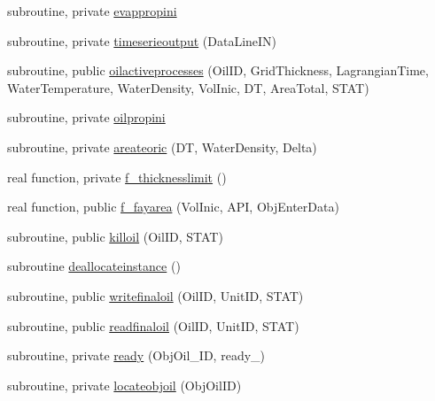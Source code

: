 \begin{DoxyCompactItemize}
\item 
subroutine, private \mbox{\hyperlink{namespacemoduleoil_accb31df9c42356be9b53b31d0d888b3b}{evappropini}}
\item 
subroutine, private \mbox{\hyperlink{namespacemoduleoil_ac0b9f29833f831cd80144ac91359798f}{timeserieoutput}} (Data\+Line\+IN)
\item 
subroutine, public \mbox{\hyperlink{namespacemoduleoil_aa53749d5416d21d1602ffd0208f0f8f2}{oilactiveprocesses}} (Oil\+ID, Grid\+Thickness, Lagrangian\+Time, Water\+Temperature, Water\+Density, Vol\+Inic, DT, Area\+Total, S\+T\+AT)
\item 
subroutine, private \mbox{\hyperlink{namespacemoduleoil_a11e04f321f0ebc3e9a379f908b8a0cd2}{oilpropini}}
\item 
subroutine, private \mbox{\hyperlink{namespacemoduleoil_aeef3927895fe2023671f25edeb829a30}{areateoric}} (DT, Water\+Density, Delta)
\item 
real function, private \mbox{\hyperlink{namespacemoduleoil_a1e48ccf914b9fc3382e9fb87517e6a8d}{f\+\_\+thicknesslimit}} ()
\item 
real function, public \mbox{\hyperlink{namespacemoduleoil_aae34355db8babcba835b1b3af18baa95}{f\+\_\+fayarea}} (Vol\+Inic, A\+PI, Obj\+Enter\+Data)
\item 
subroutine, public \mbox{\hyperlink{namespacemoduleoil_a3515505fcda962cedd51dd5986ff6777}{killoil}} (Oil\+ID, S\+T\+AT)
\item 
subroutine \mbox{\hyperlink{namespacemoduleoil_ae94c3b6ecc29b85e8ccbddf231f67646}{deallocateinstance}} ()
\item 
subroutine, public \mbox{\hyperlink{namespacemoduleoil_afaa341d33088f674ca74e6ac763daa2d}{writefinaloil}} (Oil\+ID, Unit\+ID, S\+T\+AT)
\item 
subroutine, public \mbox{\hyperlink{namespacemoduleoil_aaa3a2256f78ae25e941bfe7a937c796b}{readfinaloil}} (Oil\+ID, Unit\+ID, S\+T\+AT)
\item 
subroutine, private \mbox{\hyperlink{namespacemoduleoil_a16763a360a31b49d4f67bbba295472a5}{ready}} (Obj\+Oil\+\_\+\+ID, ready\+\_\+)
\item 
subroutine, private \mbox{\hyperlink{namespacemoduleoil_aa0854458437dd99f9ef2103ed4f048b4}{locateobjoil}} (Obj\+Oil\+ID)
\end{DoxyCompactItemize}
